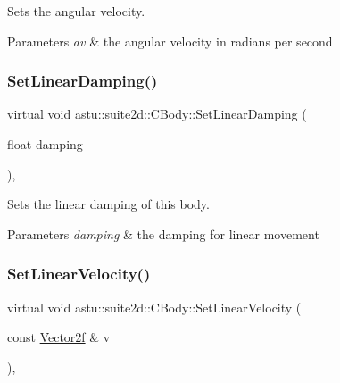 Sets the angular velocity.


\begin{DoxyParams}{Parameters}
{\em av} & the angular velocity in radians per second \\
\hline
\end{DoxyParams}
\mbox{\label{classastu_1_1suite2d_1_1CBody_a078a4f6dbcad8717341a7ebb861a8fb2}} 
\subsubsection{\texorpdfstring{Set\+Linear\+Damping()}{SetLinearDamping()}}
{\footnotesize\ttfamily virtual void astu\+::suite2d\+::\+C\+Body\+::\+Set\+Linear\+Damping (\begin{DoxyParamCaption}\item[{float}]{damping }\end{DoxyParamCaption})\hspace{0.3cm}{\ttfamily [inline]}, {\ttfamily [virtual]}}

Sets the linear damping of this body.


\begin{DoxyParams}{Parameters}
{\em damping} & the damping for linear movement \\
\hline
\end{DoxyParams}
\mbox{\label{classastu_1_1suite2d_1_1CBody_a6c05f3452c985e94b78e198ea8b78c98}} 
\subsubsection{\texorpdfstring{Set\+Linear\+Velocity()}{SetLinearVelocity()}\hspace{0.1cm}{\footnotesize\ttfamily [1/2]}}
{\footnotesize\ttfamily virtual void astu\+::suite2d\+::\+C\+Body\+::\+Set\+Linear\+Velocity (\begin{DoxyParamCaption}\item[{const \hyperlink{classastu_1_1Vector2}{Vector2f} \&}]{v }\end{DoxyParamCaption})\hspace{0.3cm}{\ttfamily [inline]}, {\ttfamily [virtual]}}

